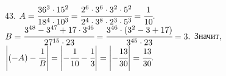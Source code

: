 43. $A=\cfrac{36^3\cdot15^2}{18^4\cdot10^3}=\cfrac{2^6\cdot3^6\cdot3^2\cdot5^2}{2^4\cdot3^8\cdot2^3\cdot5^3}=\cfrac{1}{10}.$
$B=\cfrac{3^{48}-3^{47}+17\cdot3^{46}}{27^{15}\cdot23}=\cfrac{3^{46}\cdot(3^2-3+17)}{3^{45}\cdot23}=3.$ Значит, $\left|(-A)-\cfrac{1}{B}\right|=
\left|-\cfrac{1}{10}-\cfrac{1}{3}\right|=\left|-\cfrac{13}{30}\right|=\cfrac{13}{30}.$\\
